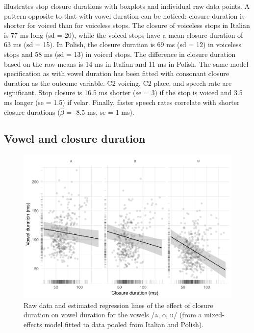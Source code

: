 \documentclass[preprint]{JASAnew}
\begin{document}
 illustrates stop closure durations with boxplots and
individual raw data points. A pattern opposite to that with vowel
duration can be noticed: closure duration is shorter for voiced than for
voiceless stops. The closure of voiceless stops in Italian is 77 ms long
(sd = 20), while the voiced stops have a mean closure duration of 63 ms
(sd = 15). In Polish, the closure duration is 69 ms (sd = 12) in
voiceless stops and 58 ms (sd = 13) in voiced stops. The difference in
closure duration based on the raw means is 14 ms in Italian and 11 ms in
Polish. The same model specification as with vowel duration has been
fitted with consonant closure duration as the outcome variable. C2
voicing, C2 place, and speech rate are significant. Stop closure is 16.5
ms shorter (se = 3) if the stop is voiced and 3.5 ms longer (se = 1.5)
if velar. Finally, faster speech rates correlate with shorter closure
durations (\(\hat{\beta}\) = -8.5 ms, se = 1 ms).

\subsection{Vowel and closure
duration}\label{vowel-and-closure-duration}

\label{s:vcduration}

\begin{figure}
\includegraphics[width=\linewidth]{Figure4} \caption{Raw data and estimated regression lines of the effect of closure duration on vowel duration for the vowels /a, o, u/ (from a mixed-effects model fitted to data pooled from Italian and Polish).}\label{f:Figure4}
\end{figure}
\end{document}

